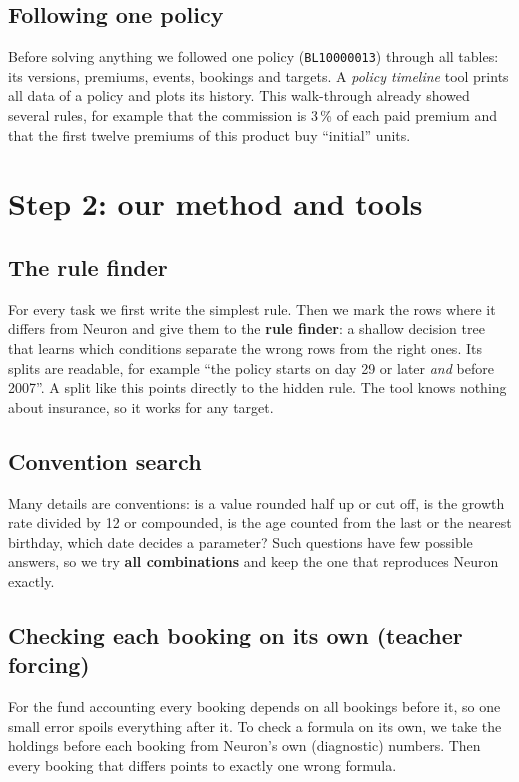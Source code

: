 \documentclass[11pt,a4paper]{article}
\newcommand{\code}[1]{\texttt{#1}}
\begin{document}
\subsection{Following one policy}
Before solving anything we followed one policy (\code{BL10000013}) through all tables: its versions, premiums,
events, bookings and targets. A \emph{policy timeline} tool prints all data of a policy and plots its history. This
walk-through already showed several rules, for example that the commission is 3\,\% of each paid premium and that the
first twelve premiums of this product buy ``initial'' units.

\section{Step 2: our method and tools}

\subsection{The rule finder}
For every task we first write the simplest rule. Then we mark the rows where it differs from Neuron and give them to
the \textbf{rule finder}: a shallow decision tree that learns which conditions separate the wrong rows from the right
ones. Its splits are readable, for example ``the policy starts on day 29 or later \emph{and} before 2007''. A split
like this points directly to the hidden rule. The tool knows nothing about insurance, so it works for any target.

\subsection{Convention search}
Many details are conventions: is a value rounded half up or cut off, is the growth rate divided by 12 or compounded,
is the age counted from the last or the nearest birthday, which date decides a parameter? Such questions have few
possible answers, so we try \textbf{all combinations} and keep the one that reproduces Neuron exactly.

\subsection{Checking each booking on its own (teacher forcing)}
For the fund accounting every booking depends on all bookings before it, so one small error spoils everything after
it. To check a formula on its own, we take the holdings before each booking from Neuron's own (diagnostic) numbers.
Then every booking that differs points to exactly one wrong formula.
\end{document}
